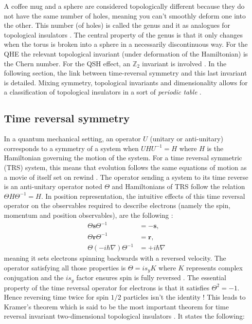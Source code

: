 A coffee mug and a sphere are considered topologically different because they do not have the same number of holes, meaning you can't smoothly deform one into the other. 
This number (of holes) is called the genus and it as analogues for topological insulators \cite{batra_physics_2020}. The central property of the genus is that it only changes when the torus is broken into a sphere in a necessarily discontinuous way. %
For the QHE the relevant topological invariant %
(under deformation of the Hamiltonian) is the Chern number. For the QSH effect, an $\mathbb{Z}_2$ invariant is involved \cite{kane_topological_2013}. In the following section, the link between time-reversal symmetry and this last invariant is detailed.  Mixing symmetry, topological invariants and dimensionality allows for a classification of topological insulators in a sort of \textit{periodic table} \cite{hasan_topological_2010}. 

\subsection{Time reversal symmetry \label{TRS}}
In a quantum mechanical setting, an operator $U$ (unitary or anti-unitary) corresponds to a symmetry of a system when $U H U^{-1} = H$ where $H$ is the Hamiltonian governing the motion of the system. For a time reversal symmetric (TRS) system, this means that evolution follows the same equations of motion as a movie of itself set on rewind \cite{shankar_topological_2018}. The operator sending a system to its time reverse is an anti-unitary operator noted $\Theta$ and Hamiltonians of TRS follow the relation $\Theta H \Theta^{-1} = H$. In position representation, the intuitive effects of this time reversal operator on the observables required to describe electrons (namely the spin, momentum and position observables), are the following \cite{shankar_topological_2018} : 
\begin{align*}
    \Theta \mathbf{s} \Theta^{-1} &=-\mathbf{s}, \\
    \Theta \mathbf{r} \Theta^{-1} &=\mathbf{r}, \\
    \Theta (-i\hbar\nabla) \Theta^{-1} &=+i\hbar\nabla
\end{align*}
meaning it sets electrons spinning backwards with a reversed velocity. The operator satisfying all those properties is $\Theta = i s_y K$ where $K$ represents complex conjugation and the $i s_y$ factor ensures spin is fully reversed \cite{bernevig_topological_2013}. The essential property of the time reversal operator for electrons is that it satisfies $\Theta^2 = -1$. Hence reversing time twice for spin $1/2$ particles isn't the identity \cite{hasan_topological_2010}! This leads to Kramer's theorem which is said to be the most important theorem for time reversal invariant two-dimensional topological insulators \cite{bernevig_topological_2013}. It states the following:\\

